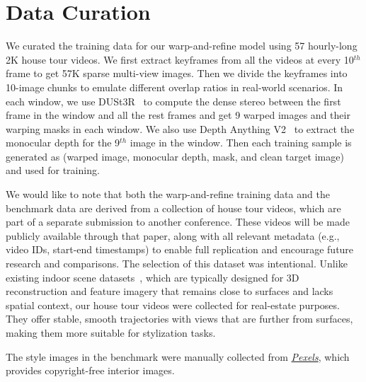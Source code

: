 \section{Data Curation}
\label{sec:train_data}
We curated the training data for our warp-and-refine model using 57 hourly-long 2K house tour videos. We first extract keyframes from all the videos at every 10$^{th}$ frame to get 57K sparse multi-view images. Then we divide the keyframes into 10-image chunks to emulate different overlap ratios in real-world scenarios. In each window, we use DUSt3R~\cite{wang2024dust3r} to compute the dense stereo between the first frame in the window and all the rest frames and get 9 warped images and their warping masks in each window. We also use Depth Anything V2~\cite{yang2024depth} to extract the monocular depth for the 9$^{th}$ image in the window. Then each training sample is generated as (warped image, monocular depth, mask, and clean target image) and used for training. 

We would like to note that both the warp-and-refine training data and the \dataset benchmark data are derived from a collection of house tour videos, which are part of a separate submission to another conference. These videos will be made publicly available through that paper, along with all relevant metadata (e.g., video IDs, start-end timestamps) to enable full replication and encourage future research and comparisons. The selection of this dataset was intentional. Unlike existing indoor scene datasets~\cite{dai2017scannet,yeshwanth2023scannet++}, which are typically designed for 3D reconstruction and feature imagery that remains close to surfaces and lacks spatial context, our house tour videos were collected for real-estate purposes. They offer stable, smooth trajectories with views that are further from surfaces, making them more suitable for stylization tasks.

The style images in the \dataset benchmark were manually collected from \href{https://www.pexels.com/search/interior%20design/}{\textit{Pexels}}, which provides copyright-free interior images.


